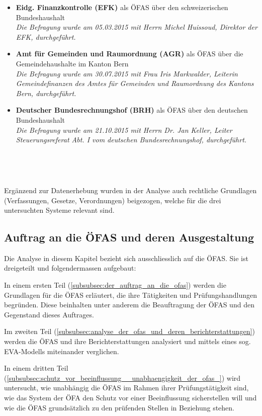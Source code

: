 \documentclass[10pt]{article}
\begin{document}
\begin{itemize}
    \item \textbf{Eidg. Finanzkontrolle (EFK)} als ÖFAS über den schweizerischen Bundeshaushalt\\
\textit{Die Befragung wurde am 05.03.2015 mit Herrn Michel Huissoud, Direktor der EFK, durchgeführt.}

    \item \textbf{Amt für Gemeinden und Raumordnung (AGR)} als ÖFAS über die Gemeindehaushalte im Kanton Bern\\
\textit{Die Befragung wurde am 30.07.2015 mit Frau Iris Markwalder, Leiterin Gemeindefinanzen des Amtes für Gemeinden und Raumordnung des Kantons Bern, durchgeführt.}

    \item \textbf{Deutscher Bundesrechnungshof (BRH)} als ÖFAS über den deutschen Bundeshaushalt\\
\textit{Die Befragung wurde am 21.10.2015 mit Herrn Dr. Jan Keller, Leiter Steuerungsreferat Abt. I vom deutschen Bundesrechnungshof, durchgeführt.}

\end{itemize}

~

~

Ergänzend zur Datenerhebung wurden in der Analyse auch rechtliche Grundlagen (Verfassungen, Gesetze, Verordnungen) beigezogen, welche für die drei untersuchten Systeme relevant sind.

\subsection{Auftrag an die ÖFAS und deren Ausgestaltung}\label{subsec:auftrag_an_die_ofas_und_deren_ausgestaltung}
Die Analyse in diesem Kapitel bezieht sich ausschliesslich auf die ÖFAS. Sie ist dreigeteilt und folgendermassen aufgebaut:

In einem ersten Teil (\vref{subsubsec:der_auftrag_an_die_ofas}) werden die Grundlagen für die ÖFAS erläutert, die ihre Tätigkeiten und Prüfungshandlungen begründen. Diese beinhalten unter anderem die Beauftragung der ÖFAS und den Gegenstand dieses Auftrages.

Im zweiten Teil (\vref{subsubsec:analyse_der_ofas_und_deren_berichterstattungen}) werden die ÖFAS und ihre Berichterstattungen analysiert und mittels eines sog. EVA-Modells miteinander verglichen.

In einem dritten Teil (\vref{subsubsec:schutz_vor_beeinflussung__unabhaengigkeit_der_ofas_}) wird untersucht, wie unabhängig die ÖFAS im Rahmen ihrer Prüfungstätigkeit sind, wie das System der ÖFA den Schutz vor einer Beeinflussung sicherstellen will und wie die ÖFAS grundsätzlich zu den prüfenden Stellen in Beziehung stehen.
\end{document}
